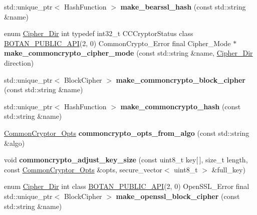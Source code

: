 \begin{DoxyCompactItemize}
\item 
\mbox{\label{namespace_botan_af523a98284b3b7e6706dcfb5d7c97b45}} 
std\+::unique\+\_\+ptr$<$ Hash\+Function $>$ {\bfseries make\+\_\+bearssl\+\_\+hash} (const std\+::string \&name)
\item 
\mbox{\label{namespace_botan_a8e4ac4b9f0330fe727238480ce1a41e0}} 
enum \mbox{\hyperlink{namespace_botan_a8d9547a8fb3e868810b169b20ac389ee}{Cipher\+\_\+\+Dir}} int typedef int32\+\_\+t C\+C\+Cryptor\+Status class \mbox{\hyperlink{namespace_botan_a6b9388030d872e586a4655b776ac9501}{B\+O\+T\+A\+N\+\_\+\+P\+U\+B\+L\+I\+C\+\_\+\+A\+PI}}(2, 0) Common\+Crypto\+\_\+\+Error final Cipher\+\_\+\+Mode $\ast$ {\bfseries make\+\_\+commoncrypto\+\_\+cipher\+\_\+mode} (const std\+::string \&name, \mbox{\hyperlink{namespace_botan_a8d9547a8fb3e868810b169b20ac389ee}{Cipher\+\_\+\+Dir}} direction)
\item 
\mbox{\label{namespace_botan_a61ec83a4c566611f6d8e01920f322947}} 
std\+::unique\+\_\+ptr$<$ Block\+Cipher $>$ {\bfseries make\+\_\+commoncrypto\+\_\+block\+\_\+cipher} (const std\+::string \&name)
\item 
\mbox{\label{namespace_botan_a23db8ff34063e064a19ae264b8c5c667}} 
std\+::unique\+\_\+ptr$<$ Hash\+Function $>$ {\bfseries make\+\_\+commoncrypto\+\_\+hash} (const std\+::string \&name)
\item 
\mbox{\label{namespace_botan_a5942b9b209ae01153944ae8978c29393}} 
\mbox{\hyperlink{struct_botan_1_1_common_cryptor___opts}{Common\+Cryptor\+\_\+\+Opts}} {\bfseries commoncrypto\+\_\+opts\+\_\+from\+\_\+algo} (const std\+::string \&algo)
\item 
\mbox{\label{namespace_botan_aa15b87b0369fc942ac52560131898341}} 
void {\bfseries commoncrypto\+\_\+adjust\+\_\+key\+\_\+size} (const uint8\+\_\+t key\mbox{[}$\,$\mbox{]}, size\+\_\+t length, const \mbox{\hyperlink{struct_botan_1_1_common_cryptor___opts}{Common\+Cryptor\+\_\+\+Opts}} \&opts, secure\+\_\+vector$<$ uint8\+\_\+t $>$ \&full\+\_\+key)
\item 
\mbox{\label{namespace_botan_a3f58d35329314c734a414c0dc8e8ba81}} 
enum \mbox{\hyperlink{namespace_botan_a8d9547a8fb3e868810b169b20ac389ee}{Cipher\+\_\+\+Dir}} int class \mbox{\hyperlink{namespace_botan_a6b9388030d872e586a4655b776ac9501}{B\+O\+T\+A\+N\+\_\+\+P\+U\+B\+L\+I\+C\+\_\+\+A\+PI}}(2, 0) Open\+S\+S\+L\+\_\+\+Error final std\+::unique\+\_\+ptr$<$ Block\+Cipher $>$ {\bfseries make\+\_\+openssl\+\_\+block\+\_\+cipher} (const std\+::string \&name)

\end{DoxyCompactItemize}
